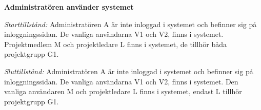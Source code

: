 \documentclass[a4paper]{article}
\begin{document}
\begin{ST}
%

\item \textbf{Administratören använder systemet}

\emph{Starttillstånd:} Administratören A är inte inloggad i systemet och befinner sig på inloggningssidan. De vanliga användarna V1 och V2, finns i systemet. Projektmedlem M och projektledare L finns i systemet, de tillhör båda projektgrupp G1.

\emph{Sluttillstånd:} Administratören A är inte inloggad i systemet och befinner sig på inloggningssidan. De vanliga användarna V1 och V2, finns i systemet. Den vanliga användaren M och projektledare L finns i systemet, endast L tillhör projektgrupp G1.


\end{ST}
\end{document}
